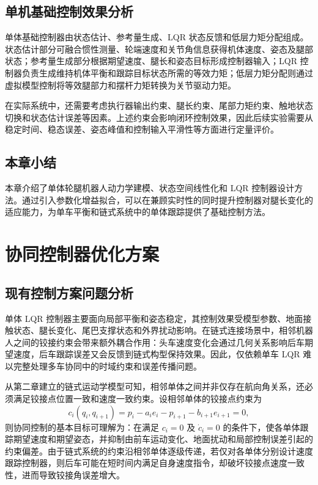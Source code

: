 \documentclass[type=bachelor]{bithesis}
\begin{document}
\section{单机基础控制效果分析}
单体基础控制器由状态估计、参考量生成、LQR 状态反馈和低层力矩分配组成。状态估计部分可融合惯性测量、轮端速度和关节角信息获得机体速度、姿态及腿部状态；参考量生成部分根据期望速度、腿长和姿态目标形成控制器输入；LQR 控制器负责生成维持机体平衡和跟踪目标状态所需的等效力矩；低层力矩分配则通过虚拟模型控制将等效腿部力和摆杆力矩转换为关节驱动力矩。



在实际系统中，还需要考虑执行器输出约束、腿长约束、尾部力矩约束、触地状态切换和状态估计误差等因素。上述约束会影响闭环控制效果，因此后续实验需要从稳定时间、稳态误差、姿态峰值和控制输入平滑性等方面进行定量评价。

\section{本章小结}
本章介绍了单体轮腿机器人动力学建模、状态空间线性化和 LQR 控制器设计方法。通过引入参数化增益拟合，可以在兼顾实时性的同时提升控制器对腿长变化的适应能力，为单车平衡和链式系统中的单体跟踪提供了基础控制方法。

\chapter{协同控制器优化方案}

\section{现有控制方案问题分析}
单体 LQR 控制器主要面向局部平衡和姿态稳定，其控制效果受模型参数、地面接触状态、腿长变化、尾巴支撑状态和外界扰动影响。在链式连接场景中，相邻机器人之间的铰接约束会带来额外耦合作用：头车速度变化会通过几何关系影响后车期望速度，后车跟踪误差又会反馈到链式构型保持效果。因此，仅依赖单车 LQR 难以完整处理多车协同中的时域约束和误差传播问题。

从第二章建立的链式运动学模型可知，相邻单体之间并非仅存在航向角关系，还必须满足铰接点位置一致和速度一致约束。设相邻单体的铰接点约束为
\begin{equation}
  c_i(q_i,q_{i+1})=p_i-a_ie_i-p_{i+1}-b_{i+1}e_{i+1}=0 ,
\end{equation}
则协同控制的基本目标可理解为：在满足 $c_i=0$ 及 $\dot{c}_i=0$ 的条件下，使各单体跟踪期望速度和期望姿态，并抑制由前车运动变化、地面扰动和局部控制误差引起的约束偏差。由于链式系统的约束沿相邻单体逐级传递，若仅对各单体分别设计速度跟踪控制器，则后车可能在短时间内满足自身速度指令，却破坏铰接点速度一致性，进而导致铰接角误差增大。
\end{document}
